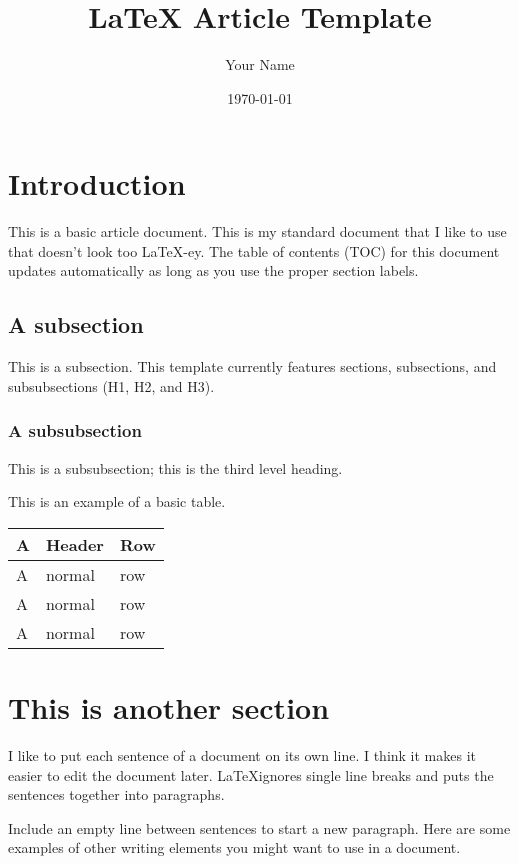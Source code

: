 \documentclass[english]{article}
\title{LaTeX Article Template} %
\author{Your Name} %
\date{\today} %
\begin{document}
\maketitle

\section{Introduction}

This is a basic article document.
This is my standard document that I like to use that doesn't look too \LaTeX-ey.
The table of contents (TOC) for this document updates automatically as long as you use the proper section labels.

\subsection{A subsection}

This is a subsection.
This template currently features sections, subsections, and subsubsections (H1, H2, and H3).

\subsubsection{A subsubsection}

This is a subsubsection; this is the third level heading.

This is an example of a basic table.

\begin{center}
\begin{tabular}{lll}
	\large{\textbf{A}} & \large{\textbf{Header}} & \large{\textbf{Row}} \\ \hline
	A & normal & row \\
	A & normal & row \\
	A & normal & row \\
\end{tabular}
\end{center}


\section{This is another section}

I like to put each sentence of a document on its own line.
I think it makes it easier to edit the document later.
\LaTeX ignores single line breaks and puts the sentences together into paragraphs.

Include an empty line between sentences to start a new paragraph.
Here are some examples of other writing elements you might want to use in a document.
\end{document}
